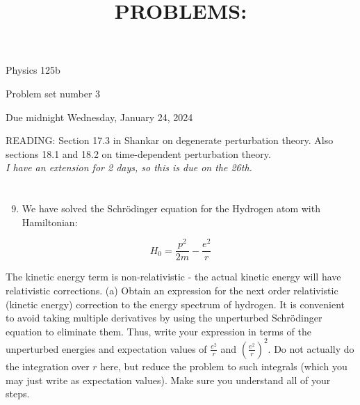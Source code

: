 \documentclass[12pt]{article}
\title{PROBLEMS: }
\author{}
\date{}
\begin{document}
\maketitle
Physics 125b

Problem set number 3

Due midnight Wednesday, January 24, 2024

READING: Section 17.3 in Shankar on degenerate perturbation theory. Also sections 18.1 and 18.2 on time-dependent perturbation theory.\\
\emph{I have an extension for 2 days, so this is due on the 26th.}
\section{}
\begin{enumerate}
  \setcounter{enumi}{8}
  \item We have solved the Schrödinger equation for the Hydrogen atom with Hamiltonian:
\end{enumerate}

$$
H_{0}=\frac{p^{2}}{2 m}-\frac{e^{2}}{r}
$$

The kinetic energy term is non-relativistic - the actual kinetic energy will have relativistic corrections.
(a) Obtain an expression for the next order relativistic (kinetic energy) correction to the energy spectrum of hydrogen. It is convenient to avoid taking multiple derivatives by using the unperturbed Schrödinger equation to eliminate them. Thus, write your expression in terms of the unperturbed energies and expectation values of $\frac{e^{2}}{r}$ and $\left(\frac{e^{2}}{r}\right)^{2}$. Do not actually do the integration over $r$ here, but reduce the problem to such integrals (which you may just write as expectation values). Make sure you understand all of your steps.
\end{document}
